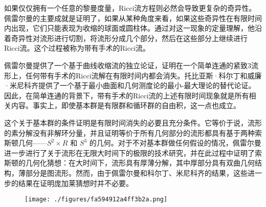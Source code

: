如果仅仅拥有一个任意的黎曼度量，Ricci流方程则必然会导致更复杂的奇异性。佩雷尔曼的主要成就是证明了，如果从某种角度来看，如果这些奇异性在有限时间内出现，它们只能表现为收缩的球面或圆柱体。通过对这一现象的定量理解，他沿着奇异性对流形进行切割，将流形分成几个部分，然后在这些部分上继续进行Ricci流。这个过程被称为带有手术的Ricci流。

佩雷尔曼提供了一个基于曲线收缩流的独立论证，证明在一个简单连通的紧致3流形上，任何带有手术的Ricci流解在有限时间内都会消失。托比亚斯·科尔丁和威廉·米尼科齐提供了一个基于最小曲面和几何测度论的最小-最大理论的替代论证。因此，在简单连通的背景下，带有手术的Ricci流的上述有限时间现象就是所有相关内容。事实上，即使基本群是有限群和循环群的自由积，这一点也成立。

这个关于基本群的条件证明是有限时间消失的必要且充分条件。它等价于说，流形的素分解没有非解环分量，并且证明等价于所有几何部分的流形都具有基于两种索斯顿几何——\( S^2 \times R \) 和 \( S^3 \) 的几何。对于不对基本群做任何假设的情况，佩雷尔曼进一步进行了关于流形在无限大时间下的极限的技术研究，并在此过程中证明了索斯顿的几何化猜想：在大时间下，流形具有厚薄分解，其中厚部分具有双曲几何结构，薄部分是图流形。然而，由于佩雷尔曼和科尔丁、米尼科齐的结果，这些进一步的结果在证明庞加莱猜想时并不必要。

\begin{figure}[ht]
\centering
\texttt{[image: ./figures/fa594912a4ff3b2a.png]}
\caption{} \label{fig_PJLCX_3}
\end{figure}